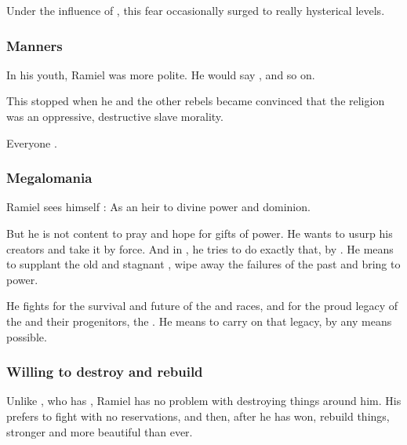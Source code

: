 Under the influence of , this fear occasionally surged to really hysterical levels. 





\subsubsection{Manners}
In his youth, Ramiel was more polite. 
He would say ,  and so on. 

This stopped when he and the other rebels became convinced that the \Merkyran{} religion was an oppressive, destructive slave morality. 

Everyone .





\subsubsection{Megalomania}
Ramiel sees himself : 
As an heir to divine power and dominion. 

But he is not content to pray and hope for gifts of power. 
He wants to usurp his creators and take it by force. 
And in \SentinelsFinalBook, he tries to do exactly that, by . 
He means to supplant the old and stagnant \banes{}, wipe away the failures of the past and bring  to power. 

He fights for the survival and future of the \resphan{} and \human{} races, and for the proud legacy of the \banes{} and their progenitors, the \voyagers. 
He means to carry on that legacy, by any means possible.





\subsubsection{Willing to destroy and rebuild}
Unlike \Nzessuacrith, who has , Ramiel has no problem with destroying things around him. 
His prefers to fight with no reservations, and then, after he has won, rebuild things, stronger and more beautiful than ever. 









